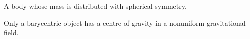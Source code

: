 A body whose mass is distributed with spherical symmetry.
\par
Only a barycentric object has a centre of gravity in a nonuniform
gravitational field.